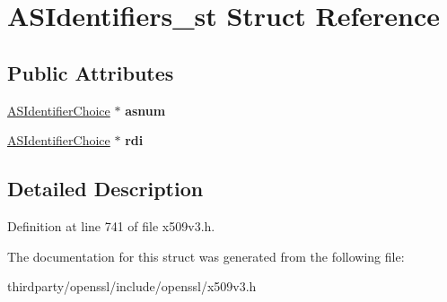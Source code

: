 \hypertarget{struct_a_s_identifiers__st}{}\section{A\+S\+Identifiers\+\_\+st Struct Reference}
\label{struct_a_s_identifiers__st}
\subsection*{Public Attributes}
\begin{DoxyCompactItemize}
\item 
\mbox{\label{struct_a_s_identifiers__st_ab8a15616176638de7321c059e45f210d}} 
\hyperlink{struct_a_s_identifier_choice__st}{A\+S\+Identifier\+Choice} $\ast$ {\bfseries asnum}
\item 
\mbox{\label{struct_a_s_identifiers__st_afa2c22bf2d18e3d2ce749486b455e0c7}} 
\hyperlink{struct_a_s_identifier_choice__st}{A\+S\+Identifier\+Choice} $\ast$ {\bfseries rdi}
\end{DoxyCompactItemize}


\subsection{Detailed Description}


Definition at line 741 of file x509v3.\+h.



The documentation for this struct was generated from the following file\+:\begin{DoxyCompactItemize}
\item 
thirdparty/openssl/include/openssl/x509v3.\+h\end{DoxyCompactItemize}
